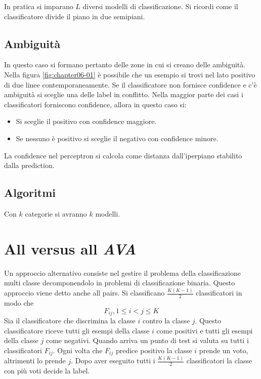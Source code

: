 In pratica si imparano $L$ diversi modelli di classificazione.
Si ricordi come il classificatore divide il piano in due semipiani.

	\subsection{Ambiguit\`a}
	In questo caso si formano pertanto delle zone in cui si creano delle ambiguit\`a. Nella figura \ref{fig:chapter06-01} \`e possibile che un esempio si trovi nel lato positivo di due linee contemporaneamente.
	Se il classificatore non fornisce confidence e c'\`e ambiguit\`a si sceglie una delle label in conflitto.
	Nella maggior parte dei casi i classificatori forniscono confidence, allora in questo caso si:
	\begin{itemize}
		\item Si sceglie il positivo con confidence maggiore.
		\item Se nessuno \`e positivo si sceglie il negativo con confidence minore.
	\end{itemize}
	La confidence nel perceptron si calcola come distanza dall'iperpiano stabilito dalla prediction.

	\subsection{Algoritmi}
	
	
	Con $k$ categorie si avranno $k$ modelli.
	
	

\section{All versus all \emph{AVA}}
Un approccio alternativo consiste nel gestire il problema della classificazione multi classe decomponendolo in problemi di classificazione binaria.
Questo approccio viene detto anche all pairs.
Si classificano $\frac{K(K-1)}{2}$ classificatori in modo che
$$F_{ij}, 1\le i< j \le K$$
Sia il classificatore che discrimina la classe $i$ contro la classe $j$.
Questo classificatore riceve tutti gli esempi della classe $i$ come positivi e tutti gli esempi della classe $j$ come negativi.
Quando arriva un punto di test si valuta su tutti i classificatori $F_{ij}$.
Ogni volta che $F_{ij}$ predice positivo la classe $i$ prende un voto, altrimenti lo prende $j$.
Dopo aver eseguito tutti i $\frac{K(K-1)}{2}$ classificatori la classe con pi\`u voti decide la label.
	
